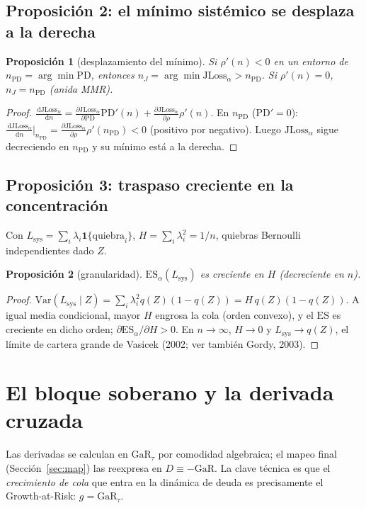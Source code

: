 \documentclass[11pt]{article}
\theoremstyle{plain}
\newtheorem{proposition}{Proposición}
\theoremstyle{definition}
\newcommand{\JLoss}{\mathrm{JLoss}}
\newcommand{\GaR}{\mathrm{GaR}}
\newcommand{\PD}{\mathrm{PD}}
\newcommand{\ES}{\mathrm{ES}}
\newcommand{\Var}{\mathrm{Var}}
\newcommand{\1}{\mathbf{1}}
\newcommand{\dd}{\,\mathrm{d}}
\begin{document}
\subsection{Proposición 2: el mínimo sistémico se desplaza a la derecha}
\begin{proposition}[desplazamiento del mínimo]\label{prop:shift}
Si $\rho'(n)<0$ en un entorno de $n_{\PD}=\arg\min\PD$, entonces $n_J=\arg\min\JLoss_\alpha>n_{\PD}$. Si $\rho'(n)=0$, $n_J=n_{\PD}$ (anida MMR).
\end{proposition}
\begin{proof}
$\frac{\dd\JLoss_\alpha}{\dd n}=\frac{\partial\JLoss_\alpha}{\partial\PD}\PD'(n)+\frac{\partial\JLoss_\alpha}{\partial\rho}\rho'(n)$. En $n_{\PD}$ ($\PD'=0$): $\frac{\dd\JLoss_\alpha}{\dd n}\big|_{n_{\PD}}=\frac{\partial\JLoss_\alpha}{\partial\rho}\rho'(n_{\PD})<0$ (positivo por negativo). Luego $\JLoss_\alpha$ sigue decreciendo en $n_{\PD}$ y su mínimo está a la derecha.
\end{proof}

\subsection{Proposición 3: traspaso creciente en la concentración}\label{sec:gran}
Con $L_{\text{sys}}=\sum_i\lambda_i\1\{\text{quiebra}_i\}$, $H=\sum_i\lambda_i^2=1/n$, quiebras Bernoulli independientes dado $Z$.
\begin{proposition}[granularidad]\label{prop:gran}
$\ES_\alpha(L_{\text{sys}})$ es creciente en $H$ (decreciente en $n$).
\end{proposition}
\begin{proof}
$\Var(L_{\text{sys}}\mid Z)=\sum_i\lambda_i^2 q(Z)(1-q(Z))=H\,q(Z)(1-q(Z))$. A igual media condicional, mayor $H$ engrosa la cola (orden convexo), y el $\ES$ es creciente en dicho orden; $\partial\ES_\alpha/\partial H>0$. En $n\to\infty$, $H\to0$ y $L_{\text{sys}}\to q(Z)$, el límite de cartera grande de Vasicek (2002; ver también Gordy, 2003).
\end{proof}

\section{El bloque soberano y la derivada cruzada}\label{sec:soberano}

Las derivadas se calculan en $\GaR_\tau$ por comodidad algebraica; el mapeo final
(Sección~\ref{sec:map}) las reexpresa en $D\equiv-\GaR$. La clave técnica es que el
\emph{crecimiento de cola} que entra en la dinámica de deuda es precisamente el
Growth-at-Risk: $g=\GaR_\tau$.
\end{document}
